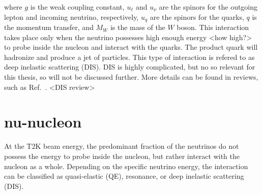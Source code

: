 where $g$ is the weak coupling constant, $u_\ell$ and $u_\nu$ are the spinors for the outgoing lepton and incoming neutrino, respectively, $u_q$ are the spinors for the quarks, $q$ is the momentum transfer, and $M_W$ is the mass of the $W$ boson.
This interaction takes place only when the neutrino possesses high enough energy <how high?> to probe inside the nucleon and interact with the quarks.
The product quark will hadronize and produce a jet of particles.
This type of interaction is refered to as deep inelastic scattering (DIS).
DIS is highly complicated, but no so relevant for this thesis, so will not be discussed further.
More details can be found in reviews, such as Ref.~\cite{}. <DIS review>

\section{nu-nucleon}
At the T2K beam energy, the predominant fraction of the neutrinos do not possess the energy to probe inside the nucleon, but rather interact with the nucleon as a whole.
Depending on the specific neutrino energy, the interaction can be classified as quasi-elastic (QE), resonance, or deep inelastic scattering (DIS).

